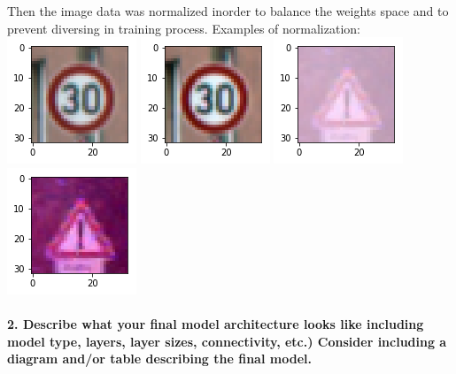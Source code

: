 \documentclass[11pt]{article}
\makeatletter
\def\maxwidth{\ifdim\Gin@nat@width>\linewidth\linewidth
    \else\Gin@nat@width\fi}
\let\Oldincludegraphics\includegraphics
\renewcommand{\includegraphics}[1]{\Oldincludegraphics[width=.8\maxwidth]{#1}}
\makeatother
\begin{document}
Then the image data was normalized inorder to balance the weights space
and to prevent diversing in training process. Examples of normalization:
\includegraphics{before_normalization1.png}
\includegraphics{after_normalization1.png}
\includegraphics{before_normalization2.png}
\includegraphics{after_normalization2.png}

\hypertarget{describe-what-your-final-model-architecture-looks-like-including-model-type-layers-layer-sizes-connectivity-etc.-consider-including-a-diagram-andor-table-describing-the-final-model.}{%
\paragraph{2. Describe what your final model architecture looks like
including model type, layers, layer sizes, connectivity, etc.) Consider
including a diagram and/or table describing the final
model.}\label{describe-what-your-final-model-architecture-looks-like-including-model-type-layers-layer-sizes-connectivity-etc.-consider-including-a-diagram-andor-table-describing-the-final-model.}}
\end{document}
